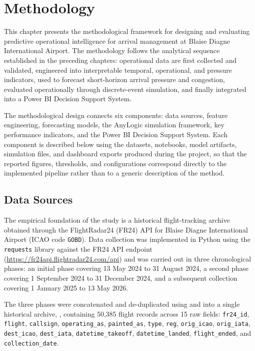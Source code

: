 \chapter{Methodology}
\label{chap:methodology}

This chapter presents the methodological framework for designing and evaluating predictive operational intelligence for arrival management at Blaise Diagne International Airport. The methodology follows the analytical sequence established in the preceding chapters: operational data are first collected and validated, engineered into interpretable temporal, operational, and pressure indicators, used to forecast short-horizon arrival pressure and congestion, evaluated operationally through discrete-event simulation, and finally integrated into a Power BI Decision Support System.

The methodological design connects six components: data sources, feature engineering, forecasting models, the AnyLogic simulation framework, key performance indicators, and the Power BI Decision Support System. Each component is described below using the datasets, notebooks, model artifacts, simulation files, and dashboard exports produced during the project, so that the reported figures, thresholds, and configurations correspond directly to the implemented pipeline rather than to a generic description of the method.

\section{Data Sources}
\label{sec:data-sources}

The empirical foundation of the study is a historical flight-tracking archive obtained through the FlightRadar24 (FR24) API for Blaise Diagne International Airport (ICAO code \texttt{GOBD}). Data collection was implemented in Python using the \texttt{requests} library against the FR24 API endpoint (\url{https://fr24api.flightradar24.com/api}) and was carried out in three chronological phases: an initial phase covering 13 May 2024 to 31 August 2024, a second phase covering 1 September 2024 to 31 December 2024, and a subsequent collection covering 1 January 2025 to 13 May 2026.

The three phases were concatenated and de-duplicated using  and  into a single historical archive, , containing 50,385 flight records across 15 raw fields: \texttt{fr24\_id}, \texttt{flight}, \texttt{callsign}, \texttt{operating\_as}, \texttt{painted\_as}, \texttt{type}, \texttt{reg}, \texttt{orig\_icao}, \texttt{orig\_iata}, \texttt{dest\_icao}, \texttt{dest\_iata}, \texttt{datetime\_takeoff}, \texttt{datetime\_landed}, \texttt{flight\_ended}, and \texttt{collection\_date}.

